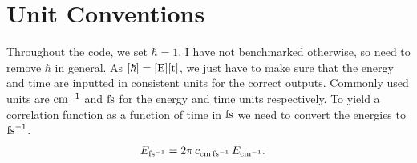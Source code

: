 \documentclass{article}
\begin{document}
\section{Unit Conventions}
Throughout the code, we set $\hbar=1$. I have not benchmarked otherwise, so need to remove $\hbar$ in general. As $[\hbar]=[{\rm E}][{\rm t}]$, we just have to make sure that the energy and time are inputted in consistent units for the correct outputs.
Commonly used units are ${\rm cm}^{-1}$ and ${\rm fs}$ for the energy and time units respectively. To yield a correlation function as a function of time in ${\rm fs}$  we need to convert the energies to ${\rm fs}^{-1}$.
\begin{align}
    E_{\rm fs^{-1}} &= 2\pi \,c_{\rm cm \,fs^{-1}}\, E_{\rm cm^{-1}}.
\end{align}
\newpage


\end{document}
